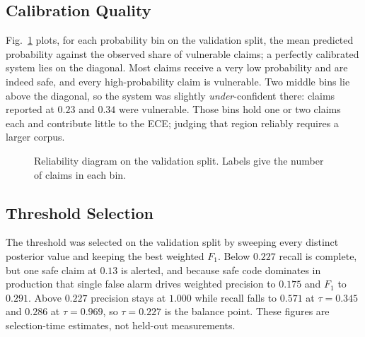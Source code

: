 \documentclass[conference]{IEEEtran}
\begin{document}
\subsection{Calibration Quality}
Fig.~\ref{fig:reliability} plots, for each probability bin on the
validation split, the mean predicted probability against the observed share
of vulnerable claims; a perfectly calibrated system lies on the diagonal.
Most claims receive a very low probability and are indeed safe, and every
high-probability claim is vulnerable. Two middle bins lie above the
diagonal, so the system was slightly \emph{under}-confident there: claims
reported at $0.23$ and $0.34$ were vulnerable. Those bins hold one or two
claims each and contribute little to the ECE; judging that region reliably
requires a larger corpus.

\begin{figure}[t]
\centering
{}
\caption{Reliability diagram on the validation split. Labels give the
number of claims in each bin.}
\label{fig:reliability}
\end{figure}

\subsection{Threshold Selection}
The threshold was selected on the validation split by sweeping every
distinct posterior value and keeping the best weighted $F_1$. Below
$0.227$ recall is complete, but one safe claim at $0.13$ is alerted, and
because safe code dominates in production that single false alarm drives
weighted precision to $0.175$ and $F_1$ to $0.291$. Above $0.227$ precision
stays at $1.000$ while recall falls to $0.571$ at $\tau=0.345$ and $0.286$
at $\tau=0.969$, so $\tau=0.227$ is the balance point. These figures are
selection-time estimates, not held-out measurements.
\end{document}
